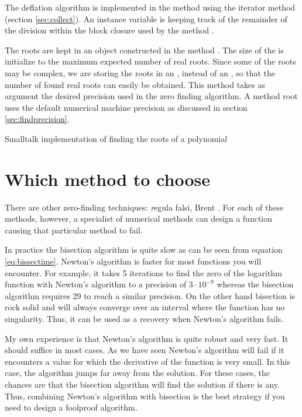 The deflation algorithm is implemented in the method  using the iterator method  (\cf section
\ref{sec:collect}). An instance variable is keeping track of the
remainder of the division within the block closure used by the
method .

The roots are kept in an  object
constructed in the method . The size of the  is initialize to the maximum expected number of
real roots. Since some of the roots may be complex, we are storing
the roots in an , instead of an , so that the number of found real roots can easily be
obtained. This method takes as argument the desired precision used
in the zero finding algorithm. A method root uses the default
numerical machine precision as discussed in section
\ref{sec:findprecision}.

\begin{listing} Smalltalk implementation of finding the roots of a polynomial \label{ls:polroots}

\end{listing}

\section{Which method to choose}
There are other zero-finding techniques: {\textit regula falsi}, Brent
\cite{Press}. For each of these methods, however, a specialist of
numerical methods can design a function causing that particular
method to fail.

In practice the bisection algorithm is quite slow as can be seen
from equation \ref{eq:bissectime}. Newton's algorithm is faster
for most functions you will encounter. For example, it takes 5
iterations to find the zero of the logarithm function with
Newton's algorithm to a precision of $3\cdot 10^{-9}$ whereas the
bisection algorithm requires 29 to reach a similar precision. On
the other hand bisection is rock solid and will always converge
over an interval where the function has no singularity. Thus, it
can be used as a recovery when Newton's algorithm fails.

My own experience is that Newton's algorithm is quite robust and
very fast. It should suffice in most cases. As we have seen
Newton's algorithm will fail if it encounters a value for which
the derivative of the function is very small. In this case, the
algorithm jumps far away from the solution. For these cases, the
chances are that the bisection algorithm will find the solution if
there is any. Thus, combining Newton's algorithm with bisection is
the best strategy if you need to design a foolproof algorithm.

